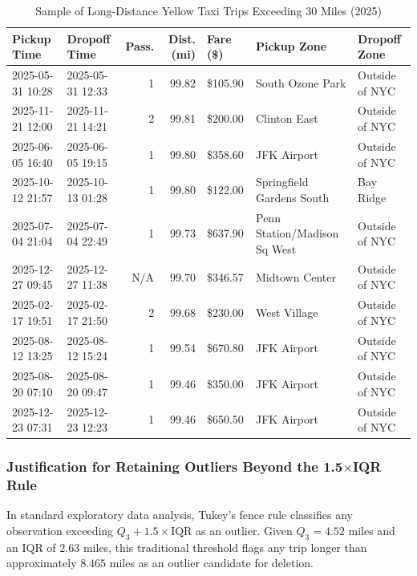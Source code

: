 \documentclass[11pt,a4paper]{article}
\begin{document}
\begin{table}[htbp]
\centering
\caption{Sample of Long-Distance Yellow Taxi Trips Exceeding 30 Miles (2025)}
\label{tab:long_distance_trips}
\small
\begin{tabularx}{\textwidth}{llrrlXX}
\toprule
\textbf{Pickup Time} & \textbf{Dropoff Time} & \textbf{Pass.} & \textbf{Dist. (mi)} & \textbf{Fare (\$)} & \textbf{Pickup Zone} & \textbf{Dropoff Zone} \\
\midrule
2025-05-31 10:28 & 2025-05-31 12:33 & 1 & 99.82 & \$105.90 & South Ozone Park & Outside of NYC \\
2025-11-21 12:00 & 2025-11-21 14:21 & 2 & 99.81 & \$200.00 & Clinton East & Outside of NYC \\
2025-06-05 16:40 & 2025-06-05 19:15 & 1 & 99.80 & \$358.60 & JFK Airport & Outside of NYC \\
2025-10-12 21:57 & 2025-10-13 01:28 & 1 & 99.80 & \$122.00 & Springfield Gardens South & Bay Ridge \\
2025-07-04 21:04 & 2025-07-04 22:49 & 1 & 99.73 & \$637.90 & Penn Station/Madison Sq West & Outside of NYC \\
2025-12-27 09:45 & 2025-12-27 11:38 & N/A & 99.70 & \$346.57 & Midtown Center & Outside of NYC \\
2025-02-17 19:51 & 2025-02-17 21:50 & 2 & 99.68 & \$230.00 & West Village & Outside of NYC \\
2025-08-12 13:25 & 2025-08-12 15:24 & 1 & 99.54 & \$670.80 & JFK Airport & Outside of NYC \\
2025-08-20 07:10 & 2025-08-20 09:47 & 1 & 99.46 & \$350.00 & JFK Airport & Outside of NYC \\
2025-12-23 07:31 & 2025-12-23 12:23 & 1 & 99.46 & \$650.50 & JFK Airport & Outside of NYC \\
\bottomrule
\end{tabularx}
\end{table}

\subsubsection{Justification for Retaining Outliers Beyond the 1.5$\times$IQR Rule}
In standard exploratory data analysis, Tukey's fence rule classifies any observation exceeding $Q_3 + 1.5 \times \text{IQR}$ as an outlier. Given $Q_3 = 4.52$ miles and an IQR of $2.63$ miles, this traditional threshold flags any trip longer than approximately $8.465$ miles as an outlier candidate for deletion. 
\end{document}
